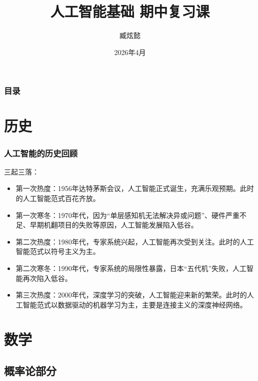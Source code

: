\documentclass[aspectratio=1610]{ctexbeamer}
\title{人工智能基础 期中复习课}
\author{臧炫懿}
\date{2026年4月}
\begin{document}
\frame{\titlepage}
\begin{frame}
    \frametitle{目录}
    \tableofcontents
\end{frame}

\section{历史}

\begin{frame}
    \frametitle{人工智能的历史回顾}

    三起三落：
    \begin{itemize}
        \item 第一次热度：1956年达特茅斯会议，人工智能正式诞生，充满乐观预期。此时的人工智能范式百花齐放。
        \item 第一次寒冬：1970年代，因为“单层感知机无法解决异或问题”、硬件严重不足、早期机翻项目的失败等原因，人工智能发展陷入低谷。
        \item 第二次热度：1980年代，专家系统兴起，人工智能再次受到关注。此时的人工智能范式以符号主义为主。
        \item 第二次寒冬：1990年代，专家系统的局限性暴露，日本“五代机”失败，人工智能再次陷入低谷。
        \item 第三次热度：2000年代，深度学习的突破，人工智能迎来新的繁荣。此时的人工智能范式以数据驱动的机器学习为主，主要是连接主义的深度神经网络。
    \end{itemize}

\end{frame}

\section{数学}
\subsection{概率论部分}
\end{document}
